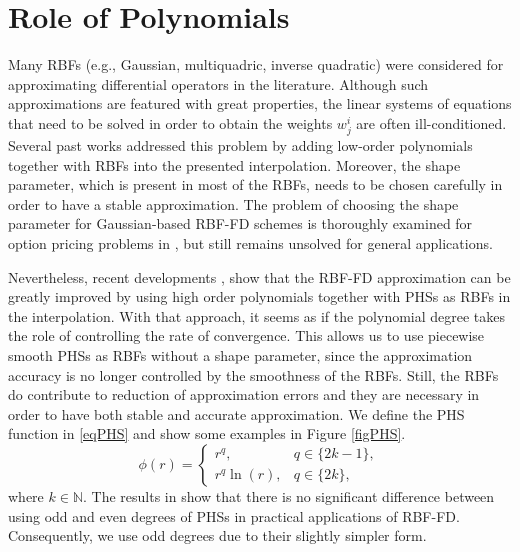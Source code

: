 \documentclass{UUThesisTemplate}
\begin{document}
\section{Role of Polynomials}
Many RBFs (e.g., Gaussian, multiquadric, inverse quadratic) were considered for approximating differential operators in the literature. Although such approximations are featured with great properties, the linear systems of equations that need to be solved in order to obtain the weights $w_j^i$ are often ill-conditioned. Several past works \cite{davydov2011adaptive, fornberg2011stabilization, flyer2012guide, larsson2013stable, fornberg2013stable, flyer2016enhancing} addressed this problem by adding low-order polynomials together with RBFs into the presented interpolation. Moreover, the shape parameter, which is present in most of the RBFs, needs to be chosen carefully in order to have a stable approximation. The problem of choosing the shape parameter for Gaussian-based RBF-FD schemes is thoroughly examined for option pricing problems in \cite{milovanovic2018radial}, but still remains unsolved for general applications.
\par
Nevertheless, recent developments \cite{bayona2017role, flyer2016on}, show that the RBF-FD approximation can be greatly improved by using high order polynomials together with PHSs as RBFs in the interpolation. With that approach, it seems as if the polynomial degree takes the role of controlling the rate of convergence. This allows us to use piecewise smooth PHSs as RBFs without a shape parameter, since the approximation accuracy is no longer controlled by the smoothness of the RBFs. Still, the RBFs do contribute to reduction of approximation errors and they are necessary in order to have both stable and accurate approximation. We define the PHS function in \eqref{eqPHS} and show some examples in Figure \ref{figPHS}.%
\begin{equation}
\label{eqPHS}
\phi(r) =  
	\begin{cases}
		r^q, & q\in\{2k-1\}, \\
		r^q \ln(r), & q\in\{2k\},
	\end{cases}
\end{equation}
where $k \in \mathbb{N}$. The results in \cite{flyer2016on} show that there is no significant difference between using odd and even degrees of PHSs in practical applications of RBF-FD. Consequently, we use odd degrees due to their slightly simpler form.%
%
\end{document}
